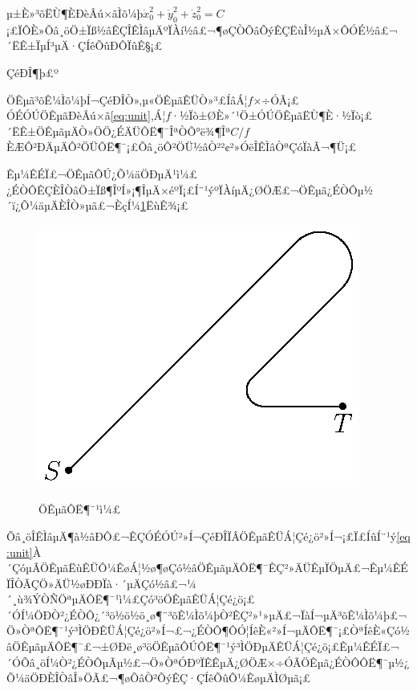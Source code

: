 \documentclass[A4,twoside]{ctexart}
\begin{document}
µ±È»³õËÙ¶ÈÐèÂú×ãÌõ¼þ$\dot{x}_0^2+\dot{y}_0^2+\dot{z}_0^2 = C$¡£ÏÔÈ»Õâ¸öÖ±Ïß½âÊÇÎÊÌâµÄºÏÀí½â£¬¶øÇÒÕâÕýÊÇËùÎ½µÄ×ÔÓÉ½â£¬´ËÊ±ÏµÍ³µÄ·ÇÍêÕûÐÔÏûÊ§¡£

ÇéÐÎ¶þ£º

ÖÊµã³õÊ¼Ìõ¼þÍ¬ÇéÐÎÒ»,µ«ÖÊµãÊÜÒ»³£ÍâÁ¦$f$×÷ÓÃ¡£
ÓÉÓÚÖÊµãÐèÂú×ã\eqref{eq:unit},Á¦$f$·½Ïò±ØÈ»´¹Ö±ÓÚÖÊµãËÙ¶È·½Ïò¡£´ËÊ±ÖÊµãµÄÒ»ÖÖ¿ÉÄÜÔË¶¯ÎªÒÔ°ë¾¶Îª$C/f$ÈÆÔ²ÐÄµÄÔ²ÖÜÔË¶¯¡£Õâ¸öÔ²ÖÜ½âÒ²²¢²»ÓëÎÊÌâÒªÇóÏàÃ¬¶Ü¡£

Êµ¼ÊÉÏ£¬ÖÊµãÔÚ¿Õ¼äÖÐµÄ¹ì¼£¿ÉÒÔÊÇÈÎÒâÖ±Ïß¶ÎºÍ»¡¶ÎµÄ×éºÏ¡£Í¨¹ýºÏÀíµÄ¿ØÖÆ£¬ÖÊµã¿ÉÒÔµ½´ï¿Õ¼äµÄÈÎÒ»µã£¬ÈçÍ¼\ref{figure:coordinate}ËùÊ¾¡£


\begin{figure}[!htp]
\centering
 \includegraphics[viewport=234 339 377 452,clip]{nonhol.eps}\\
\caption{ÖÊµãÔË¶¯¹ì¼£}\label{figure:coordinate}
\end{figure}


Õâ¸öÎÊÌâµÄ¶à½âÐÔ£¬ÊÇÓÉÓÚ²»Í¬ÇéÐÎÏÂÖÊµãÊÜÁ¦Çé¿ö²»Í¬¡£Ï£ÍûÍ¨¹ý\eqref{eq:unit}À´ÇóµÃÖÊµãËùÊÜÔ¼ÊøÁ¦½ø¶øÇó½âÖÊµãµÄÔË¶¯ÊÇ²»ÄÜÊµÏÖµÄ£¬Êµ¼ÊÉÏÎÒÃÇÖ»ÄÜ½øÐÐÏà·´µÄÇó½â£¬¼´¸ù¾ÝÒÑÖªµÄÔË¶¯¹ì¼£Çó³öÖÊµãÊÜÁ¦Çé¿ö¡£
´ÓÍ¼ÖÐÒ²¿ÉÒÔ¿´³ö½ö½ö¸ø¶¨³õÊ¼Ìõ¼þÒ²ÊÇ²»¹»µÄ£¬ÏàÍ¬µÄ³õÊ¼Ìõ¼þ£¬Ö»ÒªÔË¶¯¹ý³ÌÖÐÊÜÁ¦Çé¿ö²»Í¬£¬¿ÉÒÔ¶ÔÓ¦ÍêÈ«²»Í¬µÄÔË¶¯¡£ÒªÍêÈ«Çó½âÖÊµãµÄÔË¶¯£¬±ØÐë¸ø³öÖÊµãÔÚÔË¶¯¹ý³ÌÖÐµÄÊÜÁ¦Çé¿ö¡£Êµ¼ÊÉÏ£¬´ÓÕâ¸öÍ¼Ò²¿ÉÒÔµÃµ½£¬Ö»ÒªÓÐºÏÊÊµÄ¿ØÖÆ×÷ÓÃÖÊµã¿ÉÒÔÔË¶¯µ½¿Õ¼äÖÐÈÎÒâÎ»ÖÃ£¬¶øÕâÒ²ÕýÊÇ·ÇÍêÕûÔ¼ÊøµÄÌØµã¡£
\end{document}
